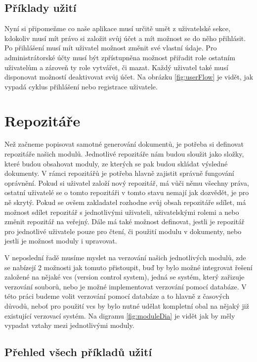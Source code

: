 \subsection{Příklady užití}

Nyní si připomeňme co naše aplikace musí určitě umět z uživatelské sekce, kdokoliv musí mít právo si založit svůj účet a mít možnost se do něho přihlásit.
Po přihlášení musí mít uživatel možnost změnit své vlastní údaje. Pro administrátorské účty musí být zpřístupněna možnost přiřadit role ostatním uživatelům
a zároveň ty role vytvářet, či mazat. Každý uživatel také musí disponovat možností deaktivovat svůj účet. Na obrázku \ref{fig:userFlow} je vidět, jak \mbox{vypadá}
cyklus přihlášení nebo registrace uživatele.

\section{Repozitáře}

Než začneme popisovat samotné generování dokumentů, je potřeba si \mbox{definovat} repozitáře našich modulů. Jednotlivé repozitáře nám budou sloužit jako složky,
které budou obsahovat moduly, ze kterých se pak budou skládat výsledné dokumenty. V rámci repozitářů je potřeba hlavně zajistit správně fungování oprávnění.
Pokud si uživatel založí nový repozitář, má vůči němu všechny práva, ostatní uživatelé se o tomto repozitáři v tomto stavu nemají jak dozvědět, je pro ně
skrytý. Pokud se ovšem zakladatel rozhodne svůj obsah repozitáře sdílet, má možnost sdílet repozitář s jednotlivými uživateli, uživatelskými rolemi a nebo
změnit repozitář na veřejný. Dále má také možnost definovat, jestli je repozitář pro jednotlivé uživatele pouze pro čtení, či použití modulu v dokumenty,
nebo jestli je možnost moduly i upravovat.

V neposlední řadě musíme myslet na verzování našich jednotlivých modulů, zde se nabízejí 2 možnosti jak tomuto přistoupit, buď by bylo možné integrovat
řešení založené na nějaké vcs (version control system), jedná se systém, který zařizuje verzování souborů,
nebo je možné implementovat verzování pomocí databáze. V této práci budeme volit verzování pomocí databáze a to hlavně z časových důvodů, neboť
pro použití vcs by bylo nutné udělat kompletní obal na nějaký již existující verzovací systém. Na digramu \ref{fig:moduleDia} je vidět jak by měly
vypadat vztahy mezi jednotlivými moduly.

\subsection{Přehled všech příkladů užití}

